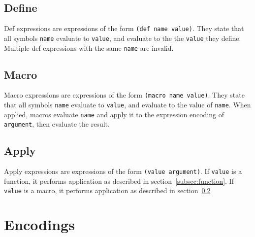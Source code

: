 \documentclass[11pt]{article}
\begin{document}
    \subsection{Define}\label{subsec:def}

    \begin{minipage}{\columnwidth}
        Def expressions are expressions of the form \lstinline{(def name value)}.
        They state that all symbols \texttt{name} evaluate to \texttt{value}, and evaluate to the the \texttt{value} they define.
        Multiple def expressions with the same \texttt{name} are invalid.
    \end{minipage}

    \subsection{Macro}\label{subsec:macro}

    \begin{minipage}{\columnwidth}
        Macro expressions are expressions of the form \lstinline{(macro name value)}.
        They state that all symbols \texttt{name} evaluate to \texttt{value}, and evaluate to the value of \texttt{name}.
        When applied, macros evaluate \texttt{name} and apply it to the expression encoding of \texttt{argument}, then evaluate the result.
    \end{minipage}

    \subsection{Apply}\label{subsec:apply}

    \begin{minipage}{\columnwidth}
        Apply expressions are expressions of the form \lstinline{(value argument)}.
        If \texttt{value} is a function, it performs application as described in section~\ref{subsec:function}.
        If \texttt{value} is a macro, it performs application as described in section~\ref{subsec:macro}
    \end{minipage}
    \newpage
    \twocolumn

    \section{Encodings}\label{sec:encodings}
\end{document}
